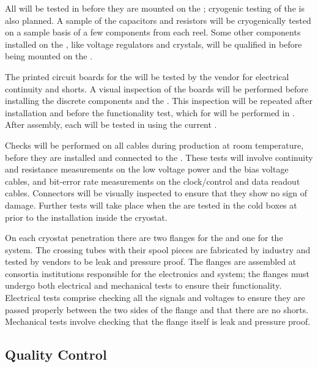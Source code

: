 All  will be tested in  before they are mounted
on the ; cryogenic testing of the  is also
planned.  A sample of the capacitors and resistors will be
cryogenically tested on a sample basis of a few components from each
reel. Some other components installed on the , like
voltage regulators and crystals, will be qualified in 
before being mounted on the .

The printed circuit boards for the  will be tested by the
vendor for electrical continuity and shorts. A visual inspection of
the boards will be performed before installing the discrete components
and the . This inspection will be repeated after
installation and before the functionality test, which for 
will be performed in .  After assembly, each 
will be tested in  using the current .

Checks will be performed on all cables during production at room
temperature, before they are installed and connected to the
. These tests will involve continuity and resistance
measurements on the low voltage power and the bias voltage cables, and
bit-error rate measurements on the clock/control and data readout
cables. Connectors will be visually inspected to ensure that they show
no sign of damage. Further tests will take place when the 
are tested in the cold boxes at  prior to the installation
inside the cryostat.

On each cryostat penetration there are two flanges for the 
and one for the  system. The crossing tubes with their spool
pieces are fabricated by industry and tested by vendors to be leak and
pressure proof. The flanges are assembled at consortia institutions
responsible for the  electronics and  system; the
flanges must undergo both electrical and mechanical tests to ensure
their functionality. Electrical tests comprise checking all the
signals and voltages to ensure they are passed properly between the
two sides of the flange and that there are no shorts. Mechanical tests
involve checking that the flange itself is leak and pressure proof.

\subsection{ Quality Control}

